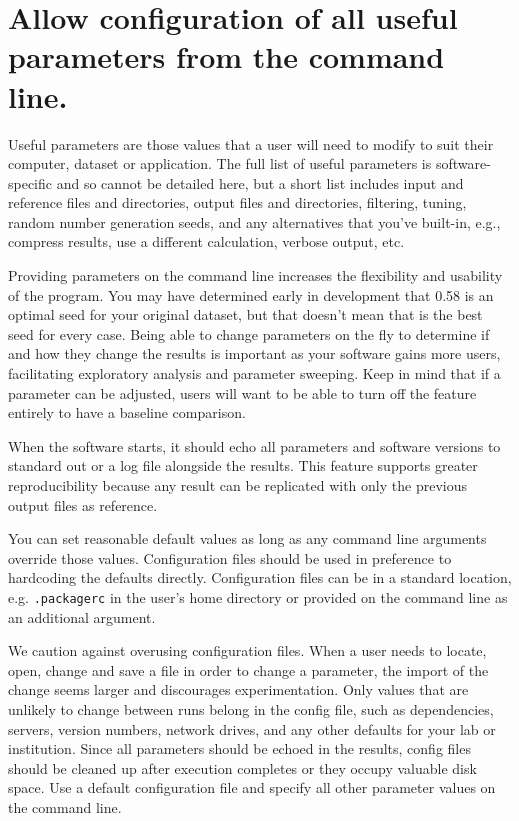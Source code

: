 \documentclass[10pt,letterpaper]{article}
\begin{document}
\section{Allow configuration of all useful parameters from the command line.}

Useful parameters are those values that a user will need to modify to suit
their computer, dataset or application. 
The full list of useful parameters is software-specific and so cannot be
detailed here, but a short list includes
input and reference files and directories,
output files and directories,
filtering,
tuning,
random number generation seeds,
and
any alternatives that you've built-in,
e.g.,
compress results, use a different calculation, verbose output, etc.

Providing parameters on the
command line increases the flexibility and usability of the program. You
may have determined early in development that 0.58 is an optimal seed for your
original dataset, but that doesn't mean that is the best seed for every
case. Being able to change parameters on the fly to determine if and how
they change the results is important as your software gains more users,
facilitating exploratory analysis and parameter sweeping. Keep in mind
that if a parameter can be adjusted, users will want to be able to turn
off the feature entirely to have a baseline comparison.

When the software starts, it should echo all parameters and software
versions to standard out or a log file alongside the results. This
feature supports greater reproducibility because any result can be
replicated with only the previous output files as reference.

You can set reasonable default values
as long as any command line arguments
override those values. Configuration files should be used in preference
to hardcoding the defaults directly. Configuration files can be in a standard
location, e.g. \texttt{.packagerc} in the user's home directory or
provided on the command line as an additional argument.

We caution against overusing configuration files. When a user needs to
locate, open, change and save a file in order to change a parameter, the
import of the change seems larger and discourages experimentation. 
Only values that are unlikely to
change between runs belong in the config file, such as dependencies,
servers, version numbers, network drives, and any other defaults for
your lab or institution. 
Since
all parameters should be echoed in the results, config files should be
cleaned up after execution completes or they occupy valuable disk space.
Use a default configuration file and specify all other parameter values on the
command line.
\end{document}

